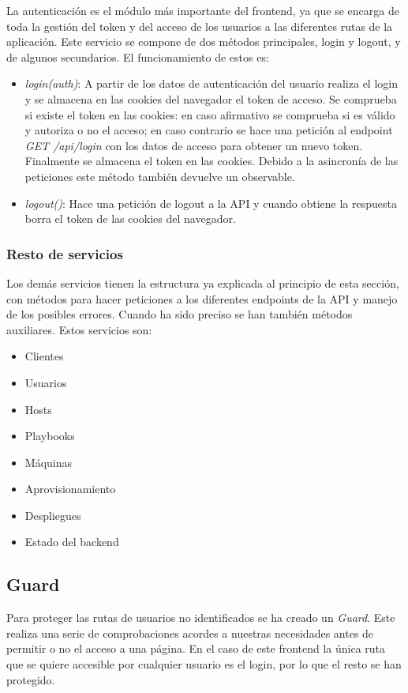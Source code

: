 La autenticación es el módulo más importante del frontend, ya que se encarga de toda la gestión del token y del acceso de los usuarios a las diferentes rutas de la aplicación. Este servicio se compone de dos métodos principales, login y logout, y de algunos secundarios. El funcionamiento de estos es:
\begin{itemize}
	\item \textit{login(auth)}: A partir de los datos de autenticación del usuario realiza el login y se almacena en las cookies del navegador el token de acceso. Se comprueba si existe el token en las cookies: en caso afirmativo se comprueba si es válido y autoriza o no el acceso; en caso contrario se hace una petición al endpoint \textit{GET /api/login} con los datos de acceso para obtener un nuevo token. Finalmente se almacena el token en las cookies. Debido a la asincronía de las peticiones este método también devuelve un observable.
	\item \textit{logout()}: Hace una petición de logout a la API y cuando obtiene la respuesta borra el token de las cookies del navegador.
\end{itemize}



\subsubsection{Resto de servicios}

Los demás servicios tienen la estructura ya explicada al principio de esta sección, con métodos para hacer peticiones a los diferentes endpoints de la API y manejo de los posibles errores. Cuando ha sido preciso se han también métodos auxiliares. Estos servicios son:
\begin{itemize}
	\item Clientes
	\item Usuarios
	\item Hosts
	\item Playbooks
	\item Máquinas
	\item Aprovisionamiento
	\item Despliegues
	\item Estado del backend
\end{itemize}


\subsection{Guard}

Para proteger las rutas de usuarios no identificados se ha creado un \textit{Guard}. Este realiza una serie de comprobaciones acordes a nuestras necesidades antes de permitir o no el acceso a una página. En el caso de este frontend la única ruta que se quiere accesible por cualquier usuario es el login, por lo que el resto se han protegido.


